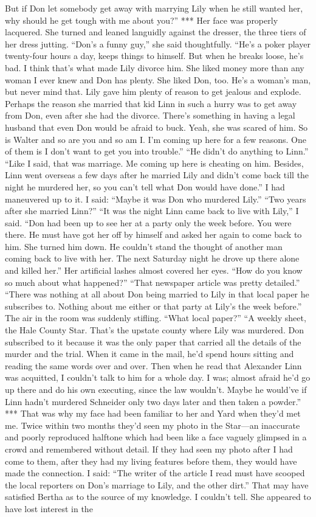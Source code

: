 \documentclass{novel}
\begin{document}
But if Don let somebody get away with marrying Lily when he still wanted her, why should he get tough with me about you?” *** Her face was properly lacquered. She turned and leaned languidly against the dresser, the three tiers of her dress jutting. “Don’s a funny guy,” she said thoughtfully. “He’s a poker player twenty-four hours a day, keeps things to himself. But when he breaks loose, he’s bad. I think that’s what made Lily divorce him. She liked money more than any woman I ever knew and Don has plenty. She liked Don, too. He’s a woman’s man, but never mind that. Lily gave him plenty of reason to get jealous and explode. Perhaps the reason she married that kid Linn in such a hurry was to get away from Don, even after she had the divorce. There’s something in having a legal husband that even Don would be afraid to buck. Yeah, she was scared of him. So is Walter and so are you and so am I. I’m coming up here for a few reasons. One of them is I don’t want to get you into trouble.” “He didn’t do anything to Linn.” “Like I said, that was marriage. Me coming up here is cheating on him. Besides, Linn went overseas a few days after he married Lily and didn’t come back till the night he murdered her, so you can’t tell what Don would have done.” I had maneuvered up to it. I said: “Maybe it was Don who murdered Lily.” “Two years after she married Linn?” “It was the night Linn came back to live with Lily,” I said. “Don had been up to see her at a party only the week before. You were there. He must have got her off by himself and asked her again to come back to him. She turned him down. He couldn’t stand the thought of another man coming back to live with her. The next Saturday night he drove up there alone and killed her.” Her artificial lashes almost covered her eyes. “How do you know so much about what happened?” “That newspaper article was pretty detailed.” “There was nothing at all about Don being married to Lily in that local paper he subscribes to. Nothing about me either or that party at Lily’s the week before.” The air in the room was suddenly stifling. “What local paper?” “A weekly sheet, the Hale County Star. That’s the upstate county where Lily was murdered. Don subscribed to it because it was the only paper that carried all the details of the murder and the trial. When it came in the mail, he’d spend hours sitting and reading the same words over and over. Then when he read that Alexander Linn was acquitted, I couldn’t talk to him for a whole day. I was; almost afraid he’d go up there and do his own executing, since the law wouldn’t. Maybe he would’ve if Linn hadn’t murdered Schneider only two days later and then taken a powder.” *** That was why my face had been familiar to her and Yard when they’d met me. Twice within two months they’d seen my photo in the Star—an inaccurate and poorly reproduced halftone which had been like a face vaguely glimpsed in a crowd and remembered without detail. If they had seen my photo after I had come to them, after they had my living features before them, they would have made the connection. I said: “The writer of the article I read must have scooped the local reporters on Don’s marriage to Lily, and the other dirt.” That may have satisfied Bertha as to the source of my knowledge. I couldn’t tell. She appeared to have lost interest in the 
\end{document}
